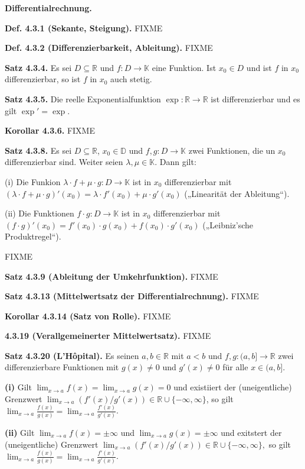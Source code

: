 \textbf{Differentialrechnung.}

\textbf{Def. 4.3.1 (Sekante, Steigung).} FIXME

\textbf{Def. 4.3.2 (Differenzierbarkeit, Ableitung).} FIXME

\textbf{Satz 4.3.4.} Es sei $D \subseteq \mathbb R$ und $f : D \rightarrow \mathbb K$ eine Funktion. Ist $x_0 \in D$ und ist $f$ in $x_0$ differenzierbar, so ist $f$ in $x_0$ auch stetig.

\textbf{Satz 4.3.5.} Die reelle Exponentialfunktion $\exp : \mathbb R \rightarrow \mathbb R$ ist differenzierbar und es gilt $\exp' = \exp$.

\textbf{Korollar 4.3.6.} FIXME

\textbf{Satz 4.3.8.} Es sei $D\subseteq \mathbb R$, $x_0 \in \mathbb D$ und $f,g : D \rightarrow \mathbb K$ zwei Funktionen, die un $x_0$ differenzierbar sind. Weiter seien $\lambda , \mu \in \mathbb K$. Dann gilt:

(i) Die Funkion $\lambda \cdot f + \mu \cdot g : D \rightarrow \mathbb K$ ist in $x_0$ differenzierbar mit $(\lambda \cdot f + \mu \cdot g)' (x_0) = \lambda \cdot f'(x_0) + \mu \cdot g' (x_0)$ („Linearität der Ableitung“).

(ii) Die Funktionen $f\cdot g : D \rightarrow \mathbb K$ ist in $x_0$ differenzierbar mit $(f \cdot g)'(x_0) = f'(x_0)\cdot g(x_0) + f(x_0) \cdot g'(x_0)$ („Leibniz’sche Produktregel“).

FIXME

\textbf{Satz 4.3.9 (Ableitung der Umkehrfunktion).} FIXME

\textbf{Satz 4.3.13 (Mittelwertsatz der Differentialrechnung).} FIXME

\textbf{Korollar 4.3.14 (Satz von Rolle).} FIXME

\textbf{4.3.19 (Verallgemeinerter Mittelwertsatz).} FIXME

\textbf{Satz 4.3.20 (L'Hôpital).} Es seinen $a,b\in\mathbb{R}$ mit
$a<b$ und $f,g:(a,b]\rightarrow\mathbb{R}$ zwei differenzierbare
Funktionen mit $g(x)\not=0$ und $g'(x)\not=0$ für alle $x\in(a,b]$.

\textbf{(i)} Gilt $\lim_{x\rightarrow a}f(x)=\lim_{x\rightarrow a}g(x)=0$
und existiiert der (uneigentliche) Grenzwert $\lim_{x\rightarrow a}(f'(x)/g'(x))\in\mathbb{R}\cup\{-\infty,\infty\}$,
so gilt $\lim_{x\rightarrow a}\frac{f(x)}{g(x)}=\lim_{x\rightarrow a}\frac{f'(x)}{g'(x)}$.

\textbf{(ii)} Gilt $\lim_{x\rightarrow a}f(x)=\pm\infty$ und $\lim_{x\rightarrow a}g(x)=\pm\infty$
und exitstert der (uneigentliche) Grenzwert $\lim_{x\rightarrow a}(f'(x)/g'(x))\in\mathbb{R}\cup\{-\infty,\infty\},$
so gilt $\lim_{x\rightarrow a}\frac{f(x)}{g(x)}=\lim_{x\rightarrow a}\frac{f'(x)}{g'(x)}$.

